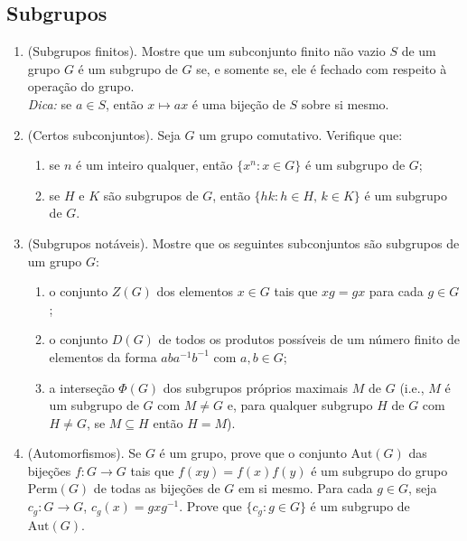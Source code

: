 \subsection{Subgrupos}

\begin{enumerate}[label=9.\arabic*.]

    \item (Subgrupos finitos). Mostre que um subconjunto finito não vazio $S$ de um grupo $G$ 
    é um subgrupo de $G$ se, e somente se, ele é fechado com respeito à operação do grupo. 
    \\ \textit{Dica:} se $a \in S$, então $x \mapsto ax$ é uma bijeção de $S$ sobre si mesmo. 

    \item (Certos subconjuntos). Seja $G$ um grupo comutativo. Verifique que: 
    \begin{enumerate}[label=(\roman*)]
        \item se $n$ é um inteiro qualquer, então $\{x^n : x \in G\}$ é um subgrupo de $G$;
        \item se $H$ e $K$ são subgrupos de $G$, então $\{hk : h \in H, \, k \in K\}$ é um subgrupo de $G$.
    \end{enumerate}

    \item (Subgrupos notáveis). Mostre que os seguintes subconjuntos são subgrupos de um grupo $G$:
    \begin{enumerate}[label=(\roman*)]
        \item o conjunto $Z(G)$ dos elementos $x \in G$ tais que $xg = gx$ para cada $g \in G$;
        \item o conjunto $D(G)$ de todos os produtos possíveis de um número finito de elementos da 
        forma $aba^{-1}b^{-1}$ com $a, b \in G$;
        \item a interseção $\Phi(G)$ dos subgrupos próprios maximais $M$ de $G$ 
        (i.e., $M$ é um subgrupo de $G$ com $M \neq G$ e, para qualquer subgrupo $H$ de $G$ com 
        $H \neq G$, se $M \subseteq H$ então $H = M$).
    \end{enumerate}

    \item (Automorfismos). Se $G$ é um grupo, prove que o conjunto $\text{Aut}(G)$ das bijeções $f : G \to G$ 
    tais que $f(xy) = f(x)f(y)$ é um subgrupo do grupo $\text{Perm}(G)$ de todas as bijeções de $G$ em si mesmo. 
    Para cada $g \in G$, seja $c_g : G \to G$, $c_g(x) = gxg^{-1}$. Prove que $\{c_g : g \in G\}$ é um subgrupo 
    de $\text{Aut}(G)$. 


\end{enumerate}
